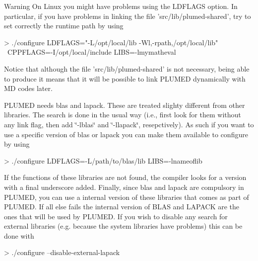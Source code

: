 \begin{DoxyWarning}{Warning}
On Linux you might have problems using the L\+D\+F\+L\+A\+G\+S option. In particular, if you have problems in linking the file 'src/lib/plumed-\/shared', try to set correctly the runtime path by using \begin{DoxyVerb}> ./configure LDFLAGS="-L/opt/local/lib -Wl,-rpath,/opt/local/lib" \
  CPPFLAGS=-I/opt/local/include LIBS=-lmymatheval
\end{DoxyVerb}
 Notice that although the file 'src/lib/plumed-\/shared' is not necessary, being able to produce it means that it will be possible to link P\+L\+U\+M\+E\+D dynamically with M\+D codes later.
\end{DoxyWarning}
P\+L\+U\+M\+E\+D needs blas and lapack. These are treated slighty different from other libraries. The search is done in the usual way (i.\+e., first look for them without any link flag, then add \char`\"{}-\/lblas\char`\"{} and \char`\"{}-\/llapack\char`\"{}, resepctively). As such if you want to use a specific version of blas or lapack you can make them available to configure by using \begin{DoxyVerb}> ./configure LDFLAGS=-L/path/to/blas/lib LIBS=-lnameoflib
\end{DoxyVerb}
 If the functions of these libraries are not found, the compiler looks for a version with a final underscore added. Finally, since blas and lapack are compulsory in P\+L\+U\+M\+E\+D, you can use a internal version of these libraries that comes as part of P\+L\+U\+M\+E\+D. If all else fails the internal version of B\+L\+A\+S and L\+A\+P\+A\+C\+K are the ones that will be used by P\+L\+U\+M\+E\+D. If you wish to disable any search for external libraries (e.\+g. because the system libraries have problems) this can be done with \begin{DoxyVerb}> ./configure --disable-external-lapack
\end{DoxyVerb}


